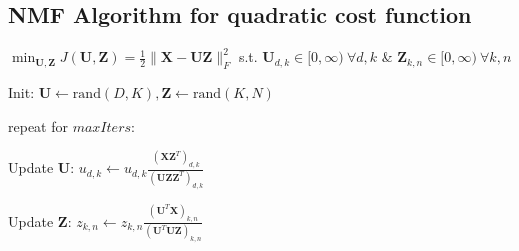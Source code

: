 \documentclass[a4paper, 11pt, landscape]{article}
\begin{document}
\begin{multicols*}{3}
\subsection{NMF Algorithm for quadratic cost function}
$\min_{\mathbf{U}, \mathbf{Z}} J(\mathbf{U}, \mathbf{Z}) = \frac{1}{2} \|\mathbf{X} - \mathbf{U}\mathbf{Z}\|_F^2$ s.t. $\mathbf{U}_{d,k} \in [0, \infty)\ \forall d, k$ \&  $\mathbf{Z}_{k, n} \in [0, \infty)\ \forall k, n$
\begin{inparaenum}
	\item Init: $\mathbf{U} \gets \mathrm{rand}(D,K), \mathbf{Z} \gets \mathrm{rand}(K,N)$
	\item repeat for $\mathit{maxIters}$:
	\item Update $\mathbf{U}$: $u_{d,k} \gets u_{d,k} \frac{(\mathbf{X}\mathbf{Z}^T)_{d,k}}{(\mathbf{U}\mathbf{Z}\mathbf{Z}^T)_{d,k}}$
	\item Update $\mathbf{Z}$: $z_{k,n} \gets z_{k,n} \frac{(\mathbf{U}^T\mathbf{X})_{k,n}}{(\mathbf{U}^T\mathbf{U}\mathbf{Z})_{k,n}}$
\end{inparaenum}

\raggedcolumns
\end{multicols*}
\end{document}
